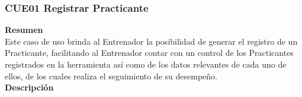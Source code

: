 \subsubsection{CUE01 Registrar Practicante}
\label{cu:CUE01}
\textbf{\textcolor[rgb]{0, 0, 0.545098}{Resumen}} \\

Este caso de uso brinda al Entrenador la posibilidad de generar el registro de un Practicante, facilitando al Entrenador contar con un control de los Practicantes registrados en la herramienta así como de los datos relevantes de cada uno de ellos, de los cuales realiza el seguimiento de su desempeño.\\

\textbf{\textcolor[rgb]{0, 0, 0.545098}{Descripción}} \\

